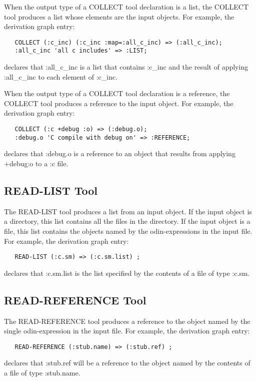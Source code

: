 When the output type of a {\ex COLLECT} tool declaration is a list,
the {\ex COLLECT} tool produces a list whose elements are the input objects.
For example, the derivation graph entry:
\begin{verbatim}
   COLLECT (:c_inc) (:c_inc :map=:all_c_inc) => (:all_c_inc);
   :all_c_inc 'all c includes' => :LIST;
\end{verbatim}
declares that {\ex :all\_c\_inc} is a list that contains {\ex :c\_inc}
and the result of applying {\ex :all\_c\_inc} to each element of {\ex :c\_inc}.

When the output type of a {\ex COLLECT} tool declaration is a reference,
the {\ex COLLECT} tool produces a reference to the input object.
For example, the derivation graph entry:
\begin{verbatim}
   COLLECT (:c +debug :o) => (:debug.o);
   :debug.o 'C compile with debug on' => :REFERENCE;
\end{verbatim}
declares that {\ex :debug.o} is a reference to an object that
results from applying {\ex +debug:o} to a {\ex :c} file.

\subsection{READ-LIST Tool}

The {\ex READ-LIST} tool produces a list from an input object.
If the input object is a directory, this list contains all the files in
the directory.
If the input object is a file, this list contains
the objects named by the odin-expressions in the input file.
For example, the derivation graph entry:
\begin{verbatim}
   READ-LIST (:c.sm) => (:c.sm.list) ;
\end{verbatim}
declares that {\ex :c.sm.list} is the list specified by the contents of
a file of type {\ex :c.sm}.

\subsection{READ-REFERENCE Tool}

The {\ex READ-REFERENCE} tool produces a reference to
the object named by the single odin-expression in the input file.
For example, the derivation graph entry:
\begin{verbatim}
   READ-REFERENCE (:stub.name) => (:stub.ref) ;
\end{verbatim}
declares that {\ex :stub.ref} will be a reference
to the object named by the contents of
a file of type {\ex :stub.name}.


